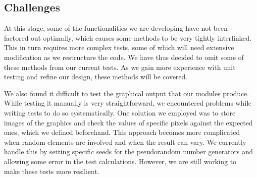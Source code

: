 \documentclass[a4paper,11pt]{article}
\begin{document}
\subsection{Challenges}
At this stage, some of the functionalities we are developing have not been factored out optimally, which causes some methods to be very tightly interlinked. This in turn requires more complex tests, some of which will need extensive modification as we restructure the code. We have thus decided to omit some of these methods from our current tests. As we gain more experience with unit testing and refine our design, these methods will be covered.

We also found it difficult to test the graphical output that our modules produce. While testing it manually is very straightforward, we encountered problems while writing tests to do so systematically. One solution we employed was to store images of the graphics and check the values of specific pixels against the expected ones, which we defined beforehand. This approach becomes more complicated when random elements are involved and when the result can vary. We currently handle this by setting specific seeds for the pseudorandom number generators and allowing some error in the test calculations. However, we are still working to make these tests more resilient.

{}

\end{document}
